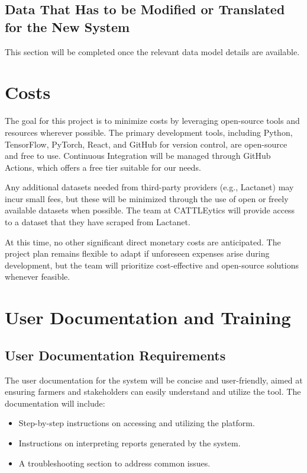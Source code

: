 \documentclass[12pt]{article}
\begin{document}
\subsection{Data That Has to be Modified or Translated for the New System}
This section will be completed once the relevant data model details are
available.

\section{Costs}
The goal for this project is to minimize costs by leveraging open-source tools
and resources wherever possible. The primary development tools, including
Python, TensorFlow, PyTorch, React, and GitHub for version control, are
open-source and free to use. Continuous Integration will be managed through
GitHub Actions, which offers a free tier suitable for our needs. 

Any additional datasets needed from third-party providers (e.g., Lactanet) may
incur small fees, but these will be minimized through the use of open or freely
available datasets when possible. The team at CATTLEytics will provide access to
a dataset that they have scraped from Lactanet.

At this time, no other significant direct monetary costs are anticipated. The
project plan remains flexible to adapt if unforeseen expenses arise during
development, but the team will prioritize cost-effective and open-source
solutions whenever feasible.

\section{User Documentation and Training}
\subsection{User Documentation Requirements}
The user documentation for the system will be concise and user-friendly, aimed
at ensuring farmers and stakeholders can easily understand and utilize the tool.
The documentation will include:
\begin{itemize}
  \item Step-by-step instructions on accessing and utilizing the platform.
  \item Instructions on interpreting reports generated by the system.
  \item A troubleshooting section to address common issues.
\end{itemize}
\end{document}
